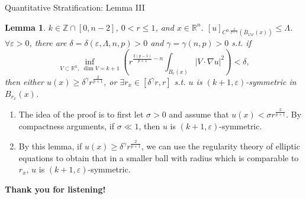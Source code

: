\documentclass[11pt]{beamer}
\newcommand{\va}{\varepsilon}
\newcommand{\Lda}{\Lambda}
\newcommand{\Z}{\mathbb{Z}}
\newcommand{\R}{\mathbb{R}}
\newcommand{\ga}{\gamma}
\newcommand{\sg}{\sigma}
\newcommand{\f}{\frac}
\newcommand{\ol}{\overline}
\newcommand{\na}{\nabla}
\def\({\left(}                 \def\){\right)}
\theoremstyle{plain}
\newtheorem{lem}[thm]{Lemma}
\theoremstyle{definition}
\begin{document}
\begin{frame}{Quantitative Stratification: Lemma III}



\begin{lem}\label{kplus1MEMS}
$ k\in\Z\cap[0,n-2] $, $ 0<r\leq 1 $, and $ x\in\R^n $. $ [u]_{C^{0,\f{2}{p+1}}(\ol{B}_{15r}(x))}\leq\Lda $. $ \forall\va>0 $, there are $ \delta=\delta(\va,\Lda,n,p)>0 $ and $ \ga=\ga(n,p)>0 $ s.t. if
$$
\inf_{V\subset\R^n,\,\,\dim V=k+1}\(r^{\f{2(p-1)}{p+1}-n}\int_{B_r(x)}|V\cdot\na u|^2\)<\delta,
$$
then either $
u(x)\geq\delta^{\ga}r^{\f{2}{p+1}} $, or $ \exists r_x\in[\delta^{\ga}r,r] $ s.t. $ u $ is $ (k+1,\va) $-symmetric in $ B_{r_x}(x) $.
\end{lem}\pause

\begin{enumerate}
\item The idea of the proof is to first let $ \sg>0 $ and assume that $ u(x)<\sg r^{\f{2}{p+1}} $. By compactness arguments, if $ \sg\ll 1 $, then $ u $ is $ (k+1,\va) $-symmetric.\pause
\item By this lemma, if $ u(x)\geq\delta^{\ga}r^{\f{2}{p+1}} $, we can use the regularity theory of elliptic equations to obtain that in a smaller ball with radius which is comparable to $ r_x $, $ u $ is $ (k+1,\va) $-symmetric.
\end{enumerate}

\end{frame}



\begin{frame}
\centerline{\Large\textbf{Thank you for listening!}}    
\end{frame}
\end{document}
